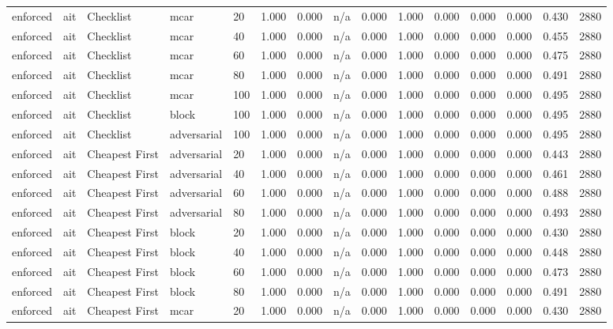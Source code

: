 \begin{table}[!ht]
{\begin{tabular}{lllllllllllllll}
enforced & ait & Checklist & mcar & 20 & 1.000 & 0.000 & n/a & 0.000 & 1.000 & 0.000 & 0.000 & 0.000 & 0.430 & 2880 \\
enforced & ait & Checklist & mcar & 40 & 1.000 & 0.000 & n/a & 0.000 & 1.000 & 0.000 & 0.000 & 0.000 & 0.455 & 2880 \\
enforced & ait & Checklist & mcar & 60 & 1.000 & 0.000 & n/a & 0.000 & 1.000 & 0.000 & 0.000 & 0.000 & 0.475 & 2880 \\
enforced & ait & Checklist & mcar & 80 & 1.000 & 0.000 & n/a & 0.000 & 1.000 & 0.000 & 0.000 & 0.000 & 0.491 & 2880 \\
enforced & ait & Checklist & mcar & 100 & 1.000 & 0.000 & n/a & 0.000 & 1.000 & 0.000 & 0.000 & 0.000 & 0.495 & 2880 \\
enforced & ait & Checklist & block & 100 & 1.000 & 0.000 & n/a & 0.000 & 1.000 & 0.000 & 0.000 & 0.000 & 0.495 & 2880 \\
enforced & ait & Checklist & adversarial & 100 & 1.000 & 0.000 & n/a & 0.000 & 1.000 & 0.000 & 0.000 & 0.000 & 0.495 & 2880 \\
enforced & ait & Cheapest First & adversarial & 20 & 1.000 & 0.000 & n/a & 0.000 & 1.000 & 0.000 & 0.000 & 0.000 & 0.443 & 2880 \\
enforced & ait & Cheapest First & adversarial & 40 & 1.000 & 0.000 & n/a & 0.000 & 1.000 & 0.000 & 0.000 & 0.000 & 0.461 & 2880 \\
enforced & ait & Cheapest First & adversarial & 60 & 1.000 & 0.000 & n/a & 0.000 & 1.000 & 0.000 & 0.000 & 0.000 & 0.488 & 2880 \\
enforced & ait & Cheapest First & adversarial & 80 & 1.000 & 0.000 & n/a & 0.000 & 1.000 & 0.000 & 0.000 & 0.000 & 0.493 & 2880 \\
enforced & ait & Cheapest First & block & 20 & 1.000 & 0.000 & n/a & 0.000 & 1.000 & 0.000 & 0.000 & 0.000 & 0.430 & 2880 \\
enforced & ait & Cheapest First & block & 40 & 1.000 & 0.000 & n/a & 0.000 & 1.000 & 0.000 & 0.000 & 0.000 & 0.448 & 2880 \\
enforced & ait & Cheapest First & block & 60 & 1.000 & 0.000 & n/a & 0.000 & 1.000 & 0.000 & 0.000 & 0.000 & 0.473 & 2880 \\
enforced & ait & Cheapest First & block & 80 & 1.000 & 0.000 & n/a & 0.000 & 1.000 & 0.000 & 0.000 & 0.000 & 0.491 & 2880 \\
enforced & ait & Cheapest First & mcar & 20 & 1.000 & 0.000 & n/a & 0.000 & 1.000 & 0.000 & 0.000 & 0.000 & 0.430 & 2880 \\

\end{tabular}}
\end{table}
